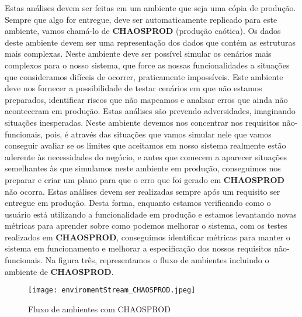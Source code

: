       Estas análises devem ser feitas em um ambiente que seja uma cópia de produção.
      Sempre que algo for entregue, deve ser automaticamente replicado para este
      ambiente, vamos chamá-lo de \textbf{CHAOSPROD} (produção caótica). Os dados
      deste ambiente devem ser uma representação dos dados que contém as estruturas
      mais complexas. Neste ambiente deve ser possível simular os cenários mais
      complexos para o nosso sistema, que force as nossas funcionalidades a situações
      que consideramos difíceis de ocorrer, praticamente impossíveis. Este ambiente
      deve nos fornecer a possibilidade de testar cenários em que não estamos preparados,
      identificar riscos que não mapeamos e analisar erros que ainda não aconteceram
      em produção. \newline
      Estas análises são prevendo adversidades, imaginando situações inesperadas.
      Neste ambiente devemos nos concentrar nos requisitos não-funcionais, pois,
      é através das situações que vamos simular nele que vamos conseguir avaliar
      se os limites que aceitamos em nosso sistema realmente estão aderente às
      necessidades do negócio, e antes que comecem a aparecer situações semelhantes
      às que simulamos neste ambiente em produção, conseguimos nos preparar e criar
      um plano para que o erro que foi gerado em \textbf{CHAOSPROD} não ocorra.
      Estas análises devem ser realizadas sempre após um requisito ser entregue
      em produção. Desta forma, enquanto estamos verificando como o usuário está
      utilizando a funcionalidade em produção e estamos levantando novas métricas
      para aprender sobre como podemos melhorar o sistema, com os testes realizados
      em \textbf{CHAOSPROD}, conseguimos identificar métricas para manter o
      sistema em funcionamento e melhorar a especificação dos nossos requisitos
      não-funcionais. Na figura três, representamos o fluxo de ambientes incluindo
      o ambiente de \textbf{CHAOSPROD}.

      \begin{figure}[!h]
        \centering
        \texttt{[image: enviromentStream\_CHAOSPROD.jpeg]}
        \caption{Fluxo de ambientes com CHAOSPROD}
        \label{Imagem:3}
      \end{figure}

